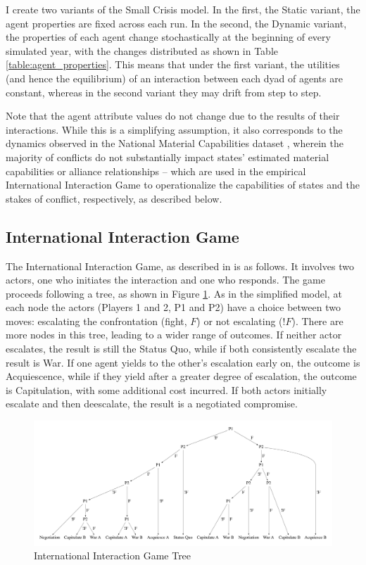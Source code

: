 I create two variants of the Small Crisis model. In the first, the Static variant, the agent properties are fixed across each run. In the second, the Dynamic variant, the properties of each agent change stochastically at the beginning of every simulated year, with the changes distributed as shown in Table \ref{table:agent_properties}. This means that under the first variant, the utilities (and hence the equilibrium) of an interaction between each dyad of agents are constant, whereas in the second variant they may drift from step to step.

Note that the agent attribute values do not change due to the results of their interactions. While this is a simplifying assumption, it also corresponds to the dynamics observed in the National Material Capabilities dataset \citep{singer_1988,grieg_2010}, wherein the majority of conflicts do not substantially impact states' estimated material capabilities or alliance relationships -- which are used in the empirical International Interaction Game to operationalize the capabilities of states and the stakes of conflict, respectively, as described below.

\subsection{International Interaction Game} \label{sec:iig_description}

The International Interaction Game, as described in \citet{bdm_1992} is as follows. It involves two actors, one who initiates the interaction and one who responds. The game proceeds following a tree, as shown in Figure \ref{fig:iig_tree}. As in the simplified model, at each node the actors (Players 1 and 2, P1 and P2) have a choice between two moves: escalating the confrontation (fight, $F$) or not escalating ($!F$). There are more nodes in this tree, leading to a wider range of outcomes. If neither actor escalates, the result is still the Status Quo, while if both consistently escalate the result is War. If one agent yields to the other's escalation early on, the outcome is Acquiescence, while if they yield after a greater degree of escalation, the outcome is Capitulation, with some additional cost incurred. If both actors initially escalate and then deescalate, the result is a negotiated compromise. 

\begin{figure}[h!]
    \centering
	\includegraphics[width=\textwidth]{WarReason/Figures/IIGTree}

    \caption[International Interaction Game Tree]{International Interaction Game Tree \citep[from][]{bdm_1992}}
    \label{fig:iig_tree}
    \figSpace
\end{figure}

